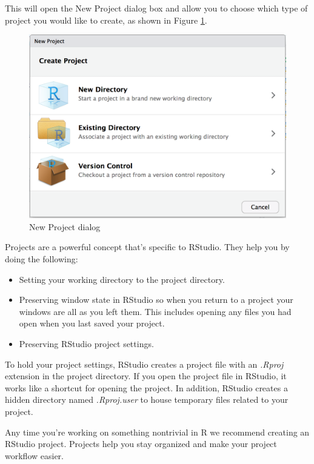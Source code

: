 \documentclass[
]{book}
\providecommand{\tightlist}{%
  \setlength{\itemsep}{0pt}\setlength{\parskip}{0pt}}
\begin{document}
This will open the New Project dialog box and allow you to choose which type of project you would like to create, as shown in Figure \ref{fig:filenewmenu}.

\begin{figure}
\includegraphics[width=14.92in]{images/rstudio.newproject.dialog} \caption{New Project dialog}\label{fig:filenewmenu}
\end{figure}

Projects are a powerful concept that's specific to RStudio. They help you by doing the following:

\begin{itemize}
\tightlist
\item
  Setting your working directory to the project directory.
\item
  Preserving window state in RStudio so when you return to a project your windows are all as you left them. This includes opening any files you had open when you last saved your project.
\item
  Preserving RStudio project settings.
\end{itemize}

To hold your project settings, RStudio creates a project file with an \emph{.Rproj} extension in the project directory. If you open the project file in RStudio, it works like a shortcut for opening the project. In addition, RStudio creates a hidden directory named \emph{.Rproj.user} to house temporary files related to your project.

Any time you're working on something nontrivial in R we recommend creating an RStudio project. Projects help you stay organized and make your project workflow easier.
\end{document}
